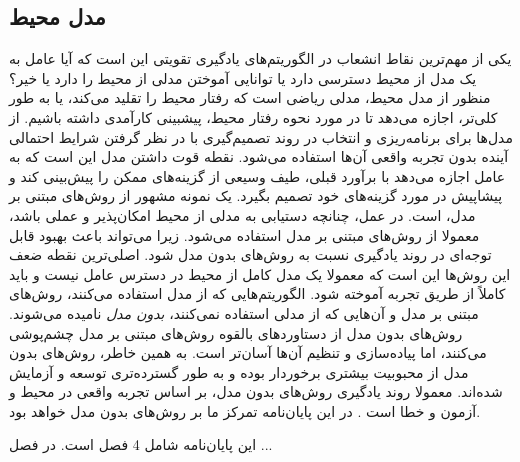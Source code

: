 \subsection{مدل محیط}
یکی از مهم‌ترین نقاط انشعاب در الگوریتم‌‌های یادگیری تقویتی این است که آیا عامل به یک مدل از محیط دسترسی دارد یا  توانایی آموختن مدلی از محیط را دارد یا خیر؟ منظور از مدل محیط، مدلی ریاضی است که رفتار محیط را تقلید می‌کند، یا به طور کلی‌تر، اجازه می‌دهد تا در مورد نحوه رفتار محیط، پیشبینی کارآمدی داشته ‌باشیم. از مدل‌ها برای برنامه‌ریزی و انتخاب در روند تصمیم‌گیری  با در نظر گرفتن شرایط احتمالی آینده بدون تجربه واقعی آن‌ها استفاده می‌شود.
نقطه قوت داشتن مدل این است که به عامل اجازه می‌دهد با برآورد قبلی، طیف وسیعی از گزینه‌های ممکن را پیش‌بینی کند و پیشاپیش در مورد گزینه‌های خود تصمیم بگیرد. یک نمونه مشهور از روش‌های مبتنی بر مدل، 
 است. در عمل، چنانچه دستیابی به مدلی از محیط امکان‌پذیر و عملی باشد، معمولا از روش‌های مبتنی بر مدل استفاده می‌شود. زیرا می‌تواند باعث بهبود قابل توجه‌ای در روند یادگیری نسبت به روش‌های بدون مدل شود. اصلی‌ترین نقطه ضعف این روش‌ها این است که معمولا یک مدل کامل از محیط  در دسترس عامل نیست و باید کاملاً از طریق تجربه آموخته ‌شود. الگوریتم‌هایی که از مدل استفاده می‌کنند، روش‌های مبتنی بر مدل و آن‌هایی که از مدلی استفاده نمی‌کنند، \textit{بدون مدل} نامیده می‌شوند. روش‌های بدون مدل از دستاوردهای بالقوه روش‌های مبتنی بر مدل چشم‌پوشی می‌کنند‌، اما پیاده‌سازی و تنظیم آن‌ها آسان‌تر است. به همین خاطر، روش‌های بدون مدل از محبوبیت بیشتری برخوردار بوده و به طور گسترده‌تری توسعه و آزمایش شده‌اند.  معمولا روند یادگیری روش‌های بدون مدل، بر اساس تجربه واقعی در محیط و آزمون و خطا است \cite{suttonbook}. در این پایان‌نامه تمرکز ما بر روش‌های بدون مدل خواهد بود.





این پایان‌نامه شامل 4 فصل است. در فصل ...
